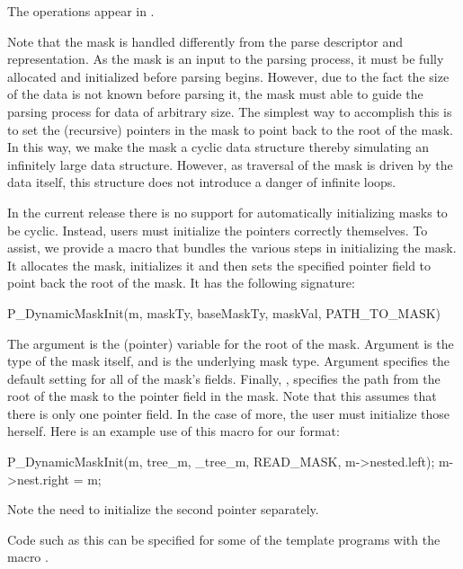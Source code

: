 The operations appear in .

Note that the mask is handled differently from the parse descriptor
and representation. As the mask is an input to the parsing process, it
must be fully allocated and initialized before parsing begins.
However, due to the fact the size of the data is not known before
parsing it, the mask must able to guide the parsing process for data
of arbitrary size. The simplest way to accomplish this is to set the
(recursive) pointers in the mask to point back to the root of the
mask. In this way, we make the mask a cyclic data structure thereby
simulating an infinitely large data structure. However, as traversal
of the mask is driven by the data itself, this structure does not
introduce a danger of infinite loops.

In the current release there is no support for automatically
initializing masks to be cyclic. Instead, users must initialize the
pointers correctly themselves. To assist, we provide a macro that
bundles the various steps in initializing the mask. It allocates the
mask, initializes it and then sets the specified pointer field to
point back the root of the mask. It has the following signature:

\begin{code}
P_DynamicMaskInit(m, maskTy, baseMaskTy, maskVal, PATH_TO_MASK)
\end{code}

The argument  is the (pointer) variable for the root of
the mask. Argument  is the type of the mask itself, and
 is the underlying mask type. Argument 
specifies the default setting for all of the mask's fields. Finally,
, specifies the path from the root of the mask to
the pointer field in the mask. Note that this assumes that there is
only one pointer field. In the case of more, the user must initialize
those herself. Here is an example use of this macro for our 
format:
\begin{code}
P_DynamicMaskInit(m, tree_m, _tree_m, READ_MASK, m->nested.left);
m->nest.right = m;
\end{code}
Note the need to initialize the second pointer separately. 

Code such as this can be specified for some of the template programs
with the macro .

